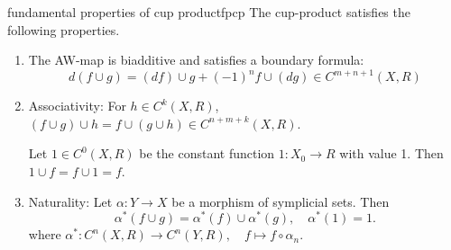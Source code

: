 \documentclass[language=english]{TemplateLecture}
\begin{document}
\begin{thm}{fundamental properties of cup product}{fpcp}
    The cup-product satisfies the following properties.
    \begin{enumerate}
        \item The AW-map is biadditive and satisfies a boundary formula:
        \[d(f\cup g) = (df) \cup g + (-1)^n f \cup (dg) \in C^{m+n+1}(X,R)\]
        \item Associativity: For \(h \in C^k(X, R)\), \((f \cup g) \cup h = f \cup (g\cup h) \in C^{n+m+k}(X,R)\).
        
        Let \(1 \in C^0(X,R)\) be the constant function \(1\colon X_0 \to R\) with value 1. Then \(1 \cup f = f\cup 1 = f\).
        \item Naturality: Let \(\alpha \colon Y \to X\) be a morphism of symplicial sets. Then
        \[\alpha^*(f \cup g) = \alpha^*(f) \cup \alpha^*(g), \quad \alpha^*(1) = 1.\]
        where \(\alpha^*\colon C^n(X,R) \to C^n(Y,R), \quad f \mapsto f\circ \alpha_n\).
    \end{enumerate}
\end{thm}
\end{document}
